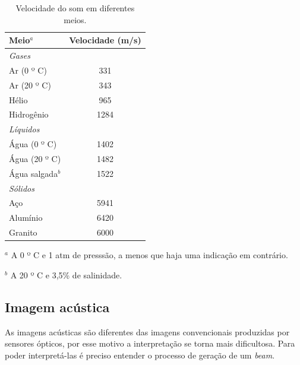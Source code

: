 \begin{table}[H]
    \centering
    \begin{threeparttable}
    \caption{Velocidade do som em diferentes meios.}
    \label{tab:vel_som}
    \begin{tabular}{lc}
        \toprule
            \textbf{Meio$^a$} & \textbf{Velocidade (m/s)} \\ 
        \midrule
            \textit{Gases} &  \\
            Ar (0 º C) & 331 \\
            Ar (20 º C) & 343 \\
            Hélio & 965 \\
            Hidrogênio & 1284 \\
            \textit{Líquidos} &  \\
            Água (0 º C) & 1402 \\
            Água (20 º C) & 1482 \\
            Água salgada$^b$ & 1522 \\
            \textit{Sólidos} &  \\
            Aço & 5941 \\
            Alumínio & 6420 \\
            Granito & 6000 \\ \bottomrule
    \end{tabular}
    \begin{tablenotes}
        \item $^a$ A 0 º C e 1 atm de presssão, a menos que haja uma indicação em contrário.
        \item $^b$ A 20 º C e 3,5\% de salinidade.
    \end{tablenotes}
    \end{threeparttable}
\end{table}

\subsection{Imagem acústica}
\label{sec:imagem_acustica}

As imagens acústicas são diferentes das imagens convencionais produzidas por sensores ópticos, por esse motivo a interpretação se torna mais dificultosa.
Para poder interpretá-las é preciso entender o processo de geração de um \textit{beam}. 

